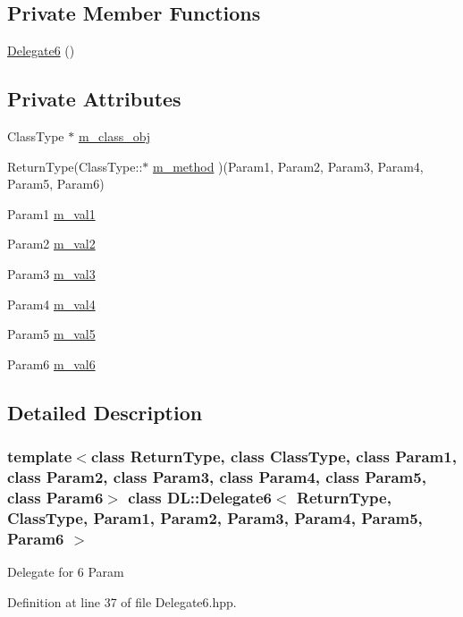 \subsection*{Private Member Functions}
\begin{CompactItemize}
\item 
\hyperlink{classDL_1_1Delegate6_d0}{Delegate6} ()
\end{CompactItemize}
\subsection*{Private Attributes}
\begin{CompactItemize}
\item 
Class\-Type $\ast$ \hyperlink{classDL_1_1Delegate6_r0}{m\_\-class\_\-obj}
\item 
Return\-Type(Class\-Type::$\ast$ \hyperlink{classDL_1_1Delegate6_r1}{m\_\-method} )(Param1, Param2, Param3, Param4, Param5, Param6)
\item 
Param1 \hyperlink{classDL_1_1Delegate6_r2}{m\_\-val1}
\item 
Param2 \hyperlink{classDL_1_1Delegate6_r3}{m\_\-val2}
\item 
Param3 \hyperlink{classDL_1_1Delegate6_r4}{m\_\-val3}
\item 
Param4 \hyperlink{classDL_1_1Delegate6_r5}{m\_\-val4}
\item 
Param5 \hyperlink{classDL_1_1Delegate6_r6}{m\_\-val5}
\item 
Param6 \hyperlink{classDL_1_1Delegate6_r7}{m\_\-val6}
\end{CompactItemize}


\subsection{Detailed Description}
\subsubsection*{template$<$class Return\-Type, class Class\-Type, class Param1, class Param2, class Param3, class Param4, class Param5, class Param6$>$ class DL::Delegate6$<$ Return\-Type, Class\-Type, Param1, Param2, Param3, Param4, Param5, Param6 $>$}

Delegate for 6 Param



Definition at line 37 of file Delegate6.hpp.

